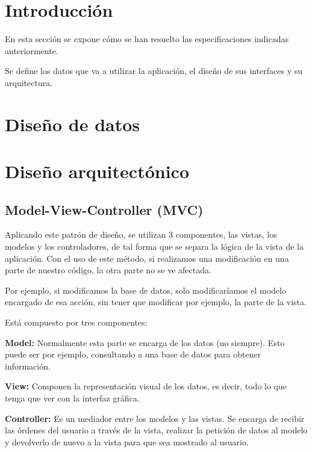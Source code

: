 
\section{Introducción}

En esta sección se expone cómo se han resuelto las especificaciones indicadas anteriormente.

Se define los datos que va a utilizar la aplicación, el diseño de sus interfaces y su arquitectura.

\section{Diseño de datos}



\section{Diseño arquitectónico}

\subsection{Model-View-Controller (MVC)}

Aplicando este patrón de diseño, se utilizan 3 componentes, las vistas, los modelos y los controladores, de tal forma que se separa la lógica de la vista de la aplicación. Con el uso de este método, si realizamos una modificación en una parte de nuestro código, la otra parte no se ve afectada.

Por ejemplo, si modificamos la base de datos, solo modificaríamos el modelo encargado de esa acción, sin tener que modificar por ejemplo, la parte de la vista.

Está compuesto por tres componentes:

\textbf{Model:} Normalmente esta parte se encarga de los datos (no siempre). Esto puede ser por ejemplo, consultando a una base de datos para obtener información.

\textbf{View:} Componen la representación visual de los datos, es decir, todo lo que tenga que ver con la interfaz gráfica.

\textbf{Controller:} Es un mediador entre los modelos y las vistas. Se encarga de recibir las órdenes del usuario a través de la vista, realizar la petición de datos al modelo y devolverlo de nuevo a la vista para que sea mostrado al usuario.

